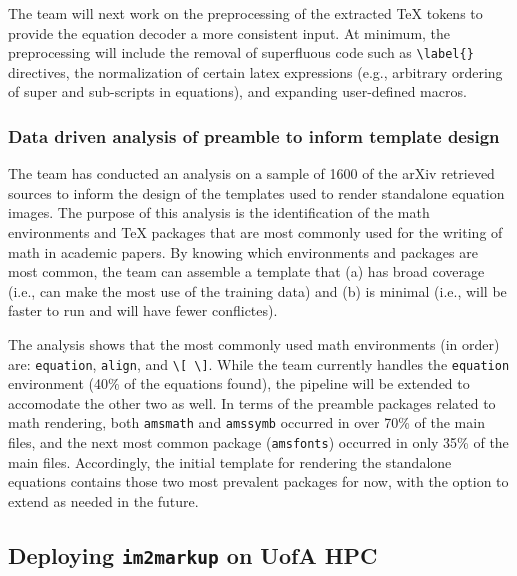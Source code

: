 \documentclass[article, 12pt, oneside]{memoir}
\begin{document}
The team will next work on the preprocessing of the extracted TeX tokens
to provide the equation decoder a more consistent input. At minimum, the
preprocessing will include the removal of superfluous code such as
\texttt{\textbackslash{}label\{\}} directives, the normalization of
certain latex expressions (e.g., arbitrary ordering of super and
sub-scripts in equations), and expanding user-defined macros.

\hypertarget{data-driven-analysis-of-preamble-to-inform-template-design}{%
\subsubsection{Data driven analysis of preamble to inform template
design}\label{data-driven-analysis-of-preamble-to-inform-template-design}}

The team has conducted an analysis on a sample of 1600 of the arXiv
retrieved sources to inform the design of the templates used to render
standalone equation images. The purpose of this analysis is the
identification of the math environments and TeX packages that are most
commonly used for the writing of math in academic papers. By knowing
which environments and packages are most common, the team can assemble a
template that (a) has broad coverage (i.e., can make the most use of the
training data) and (b) is minimal (i.e., will be faster to run and will
have fewer conflictes).

The analysis shows that the most commonly used math environments (in
order) are: \texttt{equation}, \texttt{align}, and
\texttt{\textbackslash{}{[}\ \textbackslash{}{]}}. While the team
currently handles the \texttt{equation} environment (40\% of the
equations found), the pipeline will be extended to accomodate the other
two as well. In terms of the preamble packages related to math
rendering, both \texttt{amsmath} and \texttt{amssymb} occurred in over
70\% of the main files, and the next most common package
(\texttt{amsfonts}) occurred in only 35\% of the main files.
Accordingly, the initial template for rendering the standalone equations
contains those two most prevalent packages for now, with the option to
extend as needed in the future.

\hypertarget{deploying-im2markup-on-uofa-hpc}{%
\subsection{\texorpdfstring{Deploying \texttt{im2markup} on UofA
HPC}{Deploying im2markup on UofA HPC}}\label{deploying-im2markup-on-uofa-hpc}}
\end{document}
